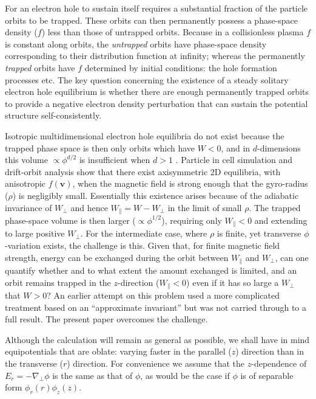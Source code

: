 \documentclass{agujournal2019}
\def\citep{\cite}
\begin{document}
For an electron hole to sustain itself requires a substantial fraction
of the particle orbits to be trapped. These orbits can then
permanently possess a phase-space density ($f$) less than those of
untrapped orbits. Because in a collisionless plasma $f$ is constant
along orbits, the \emph{untrapped} orbits have phase-space density
corresponding to their distribution function at infinity; whereas the
permanently \emph{trapped} orbits have $f$ determined by initial
conditions: the hole formation processes etc. The key question
concerning the existence of a steady solitary electron hole
equilibrium is whether there are enough permanently trapped orbits to
provide a negative electron density perturbation that can sustain the
potential structure self-consistently.

Isotropic multidimensional electron hole equilibria do not exist
because the trapped phase space is then only orbits which have $W<0$,
and in $d$-dimensions this volume $\propto \phi^{d/2}$ is insufficient
when $d>1$ \citep{Krasovsky2004,Ng2005,Ng2006}.  Particle in cell
simulation and drift-orbit analysis show that there exist axisymmetric
2D equilibria, with anisotropic $f(\bm{v})$, when the magnetic field is strong
enough that the gyro-radius ($\rho$) is negligibly small. Essentially
this existence arises because of the adiabatic invariance of $W_\perp$ and
hence $W_\parallel=W-W_\perp$ in the limit of small $\rho$. The
trapped phase-space volume is then larger ($\propto \phi^{1/2}$), requiring only
$W_\parallel <0$ and extending to large positive $W_\perp$.  For the
intermediate case, where $\rho$ is finite, yet transverse
$\phi$-variation exists, the challenge is this. Given that, for finite
magnetic field strength, energy can be exchanged during the orbit
between $W_\parallel$ and $W_\perp$, can one quantify whether and to
what extent the amount exchanged is limited, and an orbit remains
trapped in the $z$-direction ($W_\parallel<0$) even if it has so large
a $W_\perp$ that $W>0$? An earlier attempt on this problem used a more
complicated treatment based on an ``approximate invariant''
\citep{Krasovsky2006} but was not carried through to a full
result. The present paper overcomes the challenge.

Although the calculation will remain as general as possible, we shall
have in mind equipotentials that are oblate: varying faster in the
parallel ($z$) direction than in the transverse ($r$) direction.
For convenience we assume that the $z$-dependence of
$E_r=-\nabla_\perp \phi$ is the same as that of $\phi$, as would be
the case if $\phi$ is of separable form $\phi_r(r)\phi_z(z)$.
\end{document}
